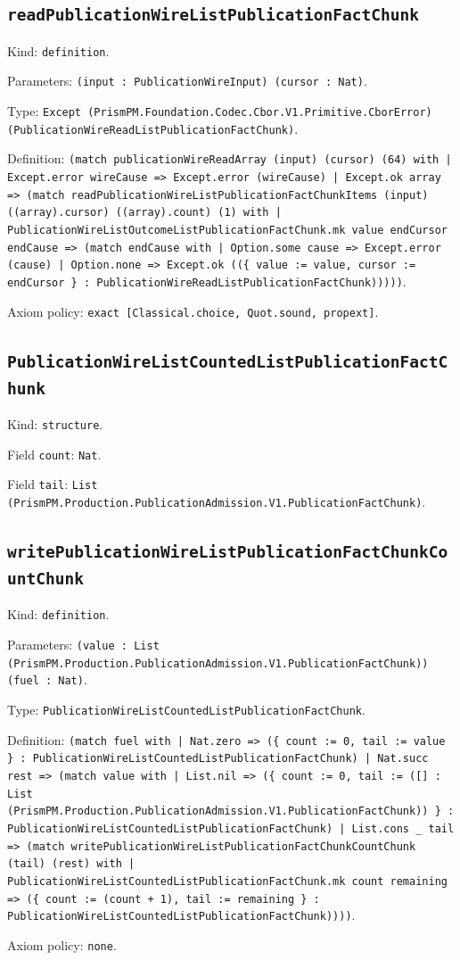 \documentclass[11pt]{article}
\begin{document}
\subsection*{\texttt{readPublicationWireListPublicationFactChunk}}
\noindent Kind: \texttt{definition}.\par
\noindent Parameters: \texttt{(input : PublicationWireInput) (cursor : Nat)}.\par
\noindent Type: \texttt{Except (PrismPM.Foundation.Codec.Cbor.V1.Primitive.CborError) (PublicationWireReadListPublicationFactChunk)}.\par
\noindent Definition: \texttt{(match publicationWireReadArray (input) (cursor) (64) with | Except.error wireCause => Except.error (wireCause) | Except.ok array => (match readPublicationWireListPublicationFactChunkItems (input) ((array).cursor) ((array).count) (1) with | PublicationWireListOutcomeListPublicationFactChunk.mk value endCursor endCause => (match endCause with | Option.some cause => Except.error (cause) | Option.none => Except.ok ((\{ value := value, cursor := endCursor \} : PublicationWireReadListPublicationFactChunk)))))}.\par
\noindent Axiom policy: \texttt{exact [Classical.choice, Quot.sound, propext]}.\par
\subsection*{\texttt{PublicationWireListCountedListPublicationFactChunk}}
\noindent Kind: \texttt{structure}.\par
\noindent Field \texttt{count}: \texttt{Nat}.\par
\noindent Field \texttt{tail}: \texttt{List (PrismPM.Production.PublicationAdmission.V1.PublicationFactChunk)}.\par
\subsection*{\texttt{writePublicationWireListPublicationFactChunkCountChunk}}
\noindent Kind: \texttt{definition}.\par
\noindent Parameters: \texttt{(value : List (PrismPM.Production.PublicationAdmission.V1.PublicationFactChunk)) (fuel : Nat)}.\par
\noindent Type: \texttt{PublicationWireListCountedListPublicationFactChunk}.\par
\noindent Definition: \texttt{(match fuel with | Nat.zero => (\{ count := 0, tail := value \} : PublicationWireListCountedListPublicationFactChunk) | Nat.succ rest => (match value with | List.nil => (\{ count := 0, tail := ([] : List (PrismPM.Production.PublicationAdmission.V1.PublicationFactChunk)) \} : PublicationWireListCountedListPublicationFactChunk) | List.cons \_ tail => (match writePublicationWireListPublicationFactChunkCountChunk (tail) (rest) with | PublicationWireListCountedListPublicationFactChunk.mk count remaining => (\{ count := (count + 1), tail := remaining \} : PublicationWireListCountedListPublicationFactChunk))))}.\par
\noindent Axiom policy: \texttt{none}.\par
\end{document}
